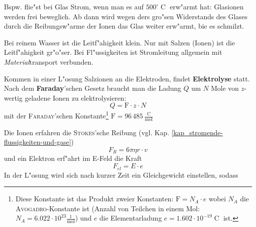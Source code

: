 \begin{description}[\setlabelstyle{\bfseries\slshape}]
\begin{description}[\setlabelstyle{\bfseries\slshape}]
      \begin{Beispiel}
      Bspw. flie"st bei Glas Strom, wenn man es auf
      $500^\circ\operatorname{C}$ erw"armt hat: Glasionen werden frei
      beweglich. Ab dann wird wegen ders gro"sen Widerstands des Glases
      durch die Reibungsw"arme der Ionen das Glas weiter erw"armt, bie
      es schmilzt.
      \end{Beispiel}
   \end{description}
\item[Fl"ussigkeiten] Bei reinem Wasser ist die Leitf"ahigkeit
   klein. Nur mit Salzen (Ionen) ist die Leitf"ahigkeit gr"o"ser. Bei
   Fl"ussigkeiten ist Stromleitung allgemein mit
   \emph{Material}transport verbunden.
   \begin{description}[\setlabelstyle{\bfseries\slshape}]
   \item[Elektrolyse] Kommen in einer L"osung Salzionen an die
      Elektroden, findet \textbf{Elektrolyse}
      statt. Nach dem \textbf{Faraday}'schen Gesetz braucht man die Ladung $Q$ um
      $N$ Mole von $z$-wertig geladene Ionen zu elektrolysieren:
      \begin{equation*}
         Q = \mathrm F \cdot z \cdot N
      \end{equation*}
      mit der \textsc{Faraday}'schen
      Konstante\footnote{Diese Konstante ist das Produkt zweier
        Konstanten: $\mathrm F = N_A \cdot e$ wobei $N_A$ die
        \textsc{Avogadro}-Konstante ist
        (Anzahl von Teilchen in einem Mol: $N_A = 6.022 \cdot
        10^{23}\frac{1}{\operatorname{mol}}$) und $e$ die
          Elementarladung $e = 1.602 \cdot 10^{-19}\operatorname{C}$ ist.} $\mathrm F = 96\,
      485\frac{\operatorname{C}}{\operatorname{mol}}$
   \item[Zusammenhang Strom, Spannung] Die Ionen erfahren die
      \textsc{Stokes}'sche Reibung
      (vgl. Kap. \ref{kap_stromende-flussigkeiten-und-gase})
      \begin{equation}
         \label{eqn_differenz-c68}
         F_R = 6 \pi \eta r \cdot v
      \end{equation}
      und ein Elektron erf"ahrt im E-Feld die Kraft
      \begin{equation}
         \label{eqn_differenz-c69}
         F_{el} = E \cdot e
      \end{equation}
      In der L"osung wird sich nach kurzer Zeit ein Gleichgewicht
      einstellen, sodass
      \begin{equation}

\end{equation}
\end{description}
\end{description}
